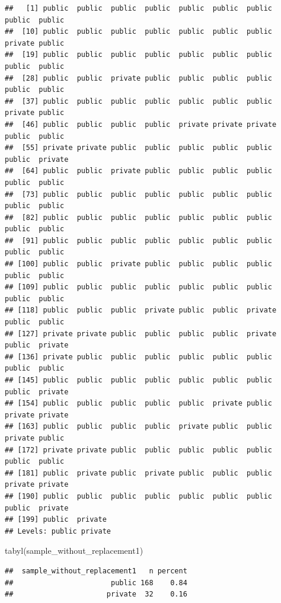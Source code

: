 \documentclass[
]{book}
\newenvironment{Shaded}{\begin{snugshade}}{\end{snugshade}}
\newcommand{\FunctionTok}[1]{\textcolor[rgb]{0.00,0.00,0.00}{#1}}
\newcommand{\NormalTok}[1]{#1}
\begin{document}
\begin{verbatim}
##   [1] public  public  public  public  public  public  public  public  public 
##  [10] public  public  public  public  public  public  public  private public 
##  [19] public  public  public  public  public  public  public  public  public 
##  [28] public  public  private public  public  public  public  public  public 
##  [37] public  public  public  public  public  public  public  private public 
##  [46] public  public  public  public  private private private public  public 
##  [55] private private public  public  public  public  public  public  private
##  [64] public  public  private public  public  public  public  public  public 
##  [73] public  public  public  public  public  public  public  public  public 
##  [82] public  public  public  public  public  public  public  public  public 
##  [91] public  public  public  public  public  public  public  public  public 
## [100] public  public  private public  public  public  public  public  public 
## [109] public  public  public  public  public  public  public  public  public 
## [118] public  public  public  private public  public  private public  public 
## [127] private private public  public  public  public  private public  private
## [136] private public  public  public  public  public  public  public  public 
## [145] public  public  public  public  public  public  public  public  private
## [154] public  public  public  public  public  private public  private private
## [163] public  public  public  public  private public  public  private public 
## [172] private private public  public  public  public  public  public  public 
## [181] public  private public  private public  public  public  private private
## [190] public  public  public  public  public  public  public  public  private
## [199] public  private
## Levels: public private
\end{verbatim}

\begin{Shaded}
\begin{Highlighting}[]
\FunctionTok{tabyl}\NormalTok{(sample\_without\_replacement1)}
\end{Highlighting}
\end{Shaded}

\begin{verbatim}
##  sample_without_replacement1   n percent
##                       public 168    0.84
##                      private  32    0.16
\end{verbatim}
\end{document}
